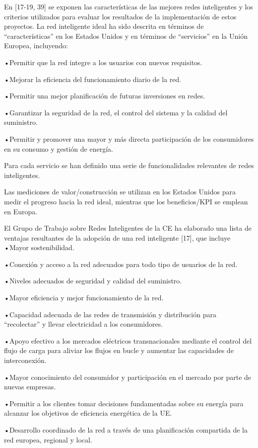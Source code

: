 \documentclass[
]{article}
\begin{document}
En {[}17-19, 39{]} se exponen las características de las mejores redes
inteligentes y los criterios utilizados para evaluar los resultados de
la implementación de estos proyectos. La red inteligente ideal ha sido
descrita en términos de ``características'' en los Estados Unidos y en
términos de ``servicios'' en la Unión Europea, incluyendo:

•Permitir que la red integre a los usuarios con nuevos requisitos.

•Mejorar la eficiencia del funcionamiento diario de la red.

•Permitir una mejor planificación de futuras inversiones en redes.

•Garantizar la seguridad de la red, el control del sistema y la calidad
del suministro.

•Permitir y promover una mayor y más directa participación de los
consumidores en su consumo y gestión de energía.

Para cada servicio se han definido una serie de funcionalidades
relevantes de redes inteligentes.

Las mediciones de valor/construcción se utilizan en los Estados Unidos
para medir el progreso hacia la red ideal, mientras que los
beneficios/KPI se emplean en Europa.

El Grupo de Trabajo sobre Redes Inteligentes de la CE ha elaborado una
lista de ventajas resultantes de la adopción de una red inteligente
{[}17{]}, que incluye •Mayor sostenibilidad.

•Conexión y acceso a la red adecuados para todo tipo de usuarios de la
red.

•Niveles adecuados de seguridad y calidad del suministro.

•Mayor eficiencia y mejor funcionamiento de la red.

•Capacidad adecuada de las redes de transmisión y distribución para
``recolectar'' y llevar electricidad a los consumidores.

•Apoyo efectivo a los mercados eléctricos transnacionales mediante el
control del flujo de carga para aliviar los flujos en bucle y aumentar
las capacidades de interconexión.

•Mayor conocimiento del consumidor y participación en el mercado por
parte de nuevas empresas.

•Permitir a los clientes tomar decisiones fundamentadas sobre su energía
para alcanzar los objetivos de eficiencia energética de la UE.

•Desarrollo coordinado de la red a través de una planificación
compartida de la red europea, regional y local.
\end{document}
